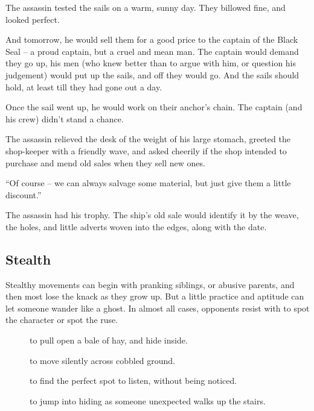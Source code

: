 \begin{multicols}{2}
\begin{exampletext}
  The assassin tested the sails on a warm, sunny day.
  They billowed fine, and looked perfect.

  And tomorrow, he would sell them for a good price to the captain of the Black Seal -- a proud captain, but a cruel and mean man.
  The captain would demand they go up, his men (who knew better than to argue with him, or question his judgement) would put up the sails, and off they would go.
  And the sails should hold, at least till they had gone out a day.

  Once the sail went up, he would work on their anchor's chain.
  The captain (and his crew) didn't stand a chance.

  The assassin relieved the desk of the weight of his large stomach, greeted the shop-keeper with a friendly wave, and asked cheerily if the shop intended to purchase and mend old sales when they sell new ones.

  ``Of course -- we can always salvage some material, but just give them a little discount.''

  The assassin had his trophy.
  The ship's old sale would identify it by the weave, the holes, and little adverts woven into the edges, along with the date.

\end{exampletext}

\subsection{Stealth}

Stealthy movements can begin with pranking siblings, or abusive parents, and then most lose the knack as they grow up.
But a little practice and aptitude can let someone wander like a ghost.
In almost all cases, opponents resist with  to spot the character or spot the ruse.

\begin{description}
  \item[]
    to pull open a bale of hay, and hide inside.
  \item[]
    to move silently across cobbled ground.
  \item[]
    to find the perfect spot to listen, without being noticed.
  \item[]
    to jump into hiding as someone unexpected walks up the stairs.
\end{description}


\end{multicols}
